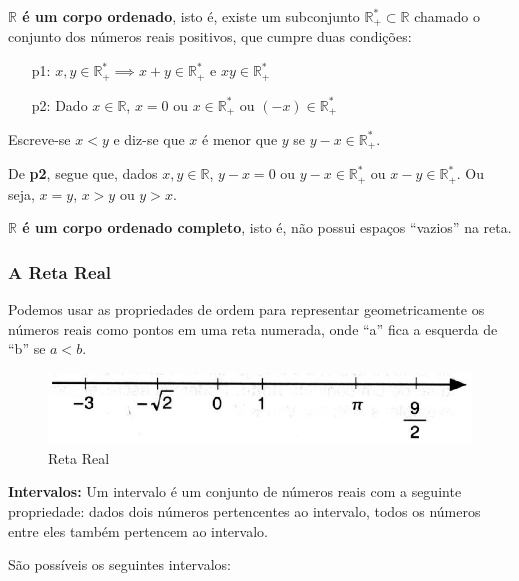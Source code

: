 \documentclass[oneside,a4paper,12pt]{article}
\begin{document}
{\bf $\mathbb{R}$ é um corpo ordenado}, isto é, existe um subconjunto $\mathbb{R}_{+}^{*} \subset \mathbb{R}$ chamado o conjunto dos números reais positivos, que cumpre duas condições:
\begin{itemize}
	\item [p1:] $x,y \in \mathbb{R}_{+}^{*} \implies x+y \in \mathbb{R}_{+}^{*}$ e $xy \in \mathbb{R}_{+}^{*}$
	\item [p2:] Dado $x \in \mathbb{R}$, $x=0$ ou $x \in \mathbb{R}_{+}^{*}$ ou $(-x) \in \mathbb{R}_{+}^{*}$
\end{itemize}

Escreve-se $x<y$ e diz-se que $x$ é menor que $y$ se $y-x \in \mathbb{R}_{+}^{*}$. 

De {\bf p2}, segue que, dados $x,y \in \mathbb{R}$, $y-x=0$ ou $y-x \in \mathbb{R}_{+}^{*}$ ou $x-y \in \mathbb{R}_{+}^{*}$. Ou seja, $x=y$, $x>y$ ou $y>x$.

{\bf $\mathbb{R}$ é um corpo ordenado completo}, isto é, não possui espaços ``vazios'' na reta.


\subsubsection{A Reta Real}

Podemos usar as propriedades de ordem para representar geometricamente os números reais como pontos em uma reta numerada, onde ``a'' fica a esquerda de ``b'' se $a<b$.



\begin{figure}[h]
	\centering
	\includegraphics[width=0.5\linewidth]{Figuras/retareal11}
	\caption{Reta Real}
	\label{venn3}
\end{figure}

\textbf{Intervalos:} Um intervalo é um conjunto de números reais com a seguinte propriedade: dados dois números pertencentes ao intervalo, todos os números entre eles também pertencem ao intervalo.

São possíveis os seguintes intervalos:
\end{document}
